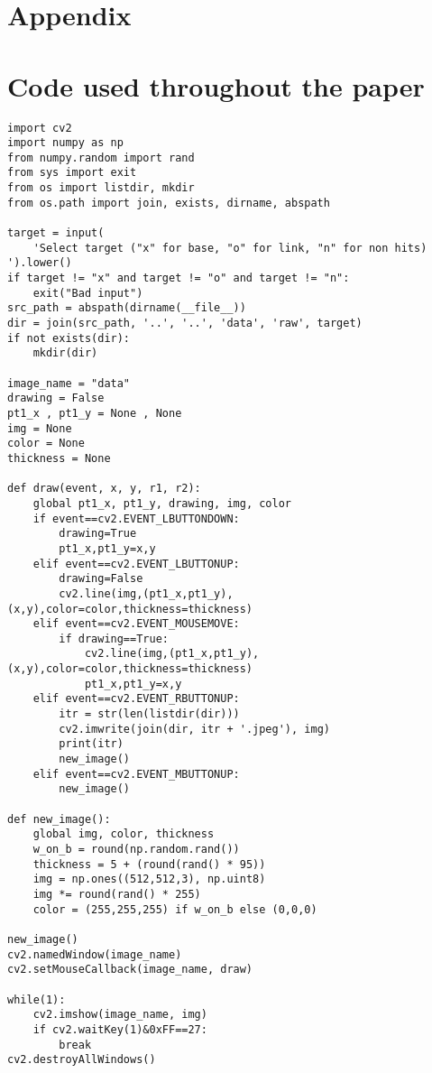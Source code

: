 \newpage
\section{Appendix}
\appendix
\section{Code used throughout the paper}
\label{appendix:a}
\begin{lstlisting}[caption=data\_generation.py]
import cv2
import numpy as np
from numpy.random import rand
from sys import exit
from os import listdir, mkdir
from os.path import join, exists, dirname, abspath

target = input(
    'Select target ("x" for base, "o" for link, "n" for non hits)   ').lower()
if target != "x" and target != "o" and target != "n":
    exit("Bad input")
src_path = abspath(dirname(__file__))
dir = join(src_path, '..', '..', 'data', 'raw', target)
if not exists(dir):
    mkdir(dir)

image_name = "data"
drawing = False
pt1_x , pt1_y = None , None
img = None
color = None
thickness = None

def draw(event, x, y, r1, r2):
    global pt1_x, pt1_y, drawing, img, color
    if event==cv2.EVENT_LBUTTONDOWN:
        drawing=True
        pt1_x,pt1_y=x,y
    elif event==cv2.EVENT_LBUTTONUP:
        drawing=False
        cv2.line(img,(pt1_x,pt1_y),(x,y),color=color,thickness=thickness)
    elif event==cv2.EVENT_MOUSEMOVE:
        if drawing==True:
            cv2.line(img,(pt1_x,pt1_y),(x,y),color=color,thickness=thickness)
            pt1_x,pt1_y=x,y
    elif event==cv2.EVENT_RBUTTONUP:
        itr = str(len(listdir(dir)))
        cv2.imwrite(join(dir, itr + '.jpeg'), img)
        print(itr)
        new_image()
    elif event==cv2.EVENT_MBUTTONUP:
        new_image()

def new_image():
    global img, color, thickness
    w_on_b = round(np.random.rand())
    thickness = 5 + (round(rand() * 95))
    img = np.ones((512,512,3), np.uint8)
    img *= round(rand() * 255)
    color = (255,255,255) if w_on_b else (0,0,0)

new_image()
cv2.namedWindow(image_name)
cv2.setMouseCallback(image_name, draw)

while(1):
    cv2.imshow(image_name, img)
    if cv2.waitKey(1)&0xFF==27:
        break
cv2.destroyAllWindows()
\end{lstlisting}